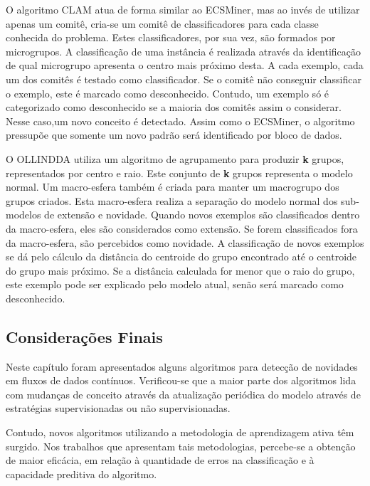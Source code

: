 \documentclass[qual, classic, a4paper]{ufbathesis}
\begin{document}
O algoritmo CLAM \cite{malkhateeb} atua de forma similar ao ECSMiner, mas ao invés de utilizar apenas um comitê, cria-se um comitê de classificadores para cada classe conhecida do problema.
Estes classificadores, por sua vez, são formados por microgrupos. A classificação de uma instância é realizada através da identificação de qual microgrupo apresenta o centro mais próximo desta. A cada exemplo, cada um dos comitês é testado como classificador. Se o comitê não conseguir classificar o exemplo, este é marcado como desconhecido. Contudo, um exemplo só é categorizado como desconhecido se a maioria dos comitês assim o considerar. Nesse caso,um novo conceito é detectado. Assim como o ECSMiner, o algoritmo pressupõe que somente um novo padrão será identificado por bloco de dados.

O OLLINDDA \cite{Spinosa:2009:NDA:1551768.1551770} utiliza um algoritmo de agrupamento para produzir \textbf{k} grupos, representados por centro e raio. Este conjunto de \textbf{k} grupos representa o modelo normal. 
Um macro-esfera também é criada para manter um macrogrupo dos grupos criados. Esta macro-esfera realiza a separação do modelo normal dos sub-modelos de extensão e novidade. 
Quando novos exemplos são classificados dentro da macro-esfera, eles são considerados como extensão. Se forem classificados fora da macro-esfera, são percebidos como novidade. 
A classificação de novos exemplos se dá pelo cálculo da distância do centroide do grupo encontrado até o centroide do grupo mais próximo.
Se a distância calculada for menor que o raio do grupo, este exemplo pode ser explicado pelo modelo atual, senão será marcado como desconhecido.

\subsection{Considerações Finais}

Neste capítulo foram apresentados alguns algoritmos para detecção de novidades em fluxos de dados contínuos. Verificou-se que a maior parte dos algoritmos lida com mudanças de conceito através da atualização periódica do modelo através de estratégias supervisionadas ou não supervisionadas.

Contudo, novos algoritmos utilizando a metodologia de aprendizagem ativa têm surgido. Nos trabalhos que apresentam tais metodologias, percebe-se a obtenção de maior eficácia, em relação à quantidade de erros na classificação e à capacidade preditiva do algoritmo.

\end{document}
